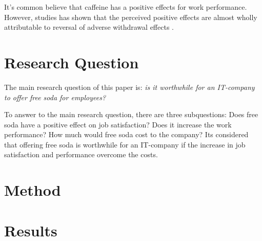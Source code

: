 \documentclass[a4paper]{article}
\begin{document}
It's common believe that caffeine has a positive effects for work performance. However, studies has shown that the perceived positive effects are almost wholly attributable to reversal of adverse withdrawal effects \citep{james2005}.



\section{Research Question}

The main research question of this paper is: \textit{is it worthwhile for an IT-company to offer free soda for employees?} 

To answer to the main research question, there are three subquestions: Does free soda have a positive effect on job satisfaction? Does it increase the work performance? How much would free soda cost to the company? Its considered that offering free soda is worthwhile for an IT-company if the increase in job satisfaction and performance overcome the costs.

\begin{comment}
Based on what other people have studied before, what is the question that no one has really answered yet? 
What is the main question, and what are perhaps the two or three sub-questions that you need to answer to be able to answer the main question? 
Be sure of what you write, because you will have to answer to this question ☺
\end{comment}

\section{Method}

\begin{comment}
How do you find an answer to the research question? 
How do you gather data? 
From where do you gather data? 
How do you analyze the data? 
Out of all the methods in the world, why did you choose this one? 
What is good about it and what is not? 
What were the alternative methods, and what were their pros and cons? 
\end{comment}

\section{Results}

\begin{comment}
What is the answer to the research question? 
What are the answers to the sub-questions? 
Keep this simple and clear.
\end{comment}
\end{document}
